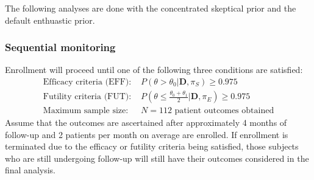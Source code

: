 \documentclass[12pt]{article}
\begin{document}


The following analyses are done with the concentrated skeptical prior and the default enthuastic prior.
\subsubsection{Sequential monitoring}
Enrollment will proceed until one of the following three conditions are satisfied:
\begin{align*}
\text{Efficacy criteria (EFF): }&P(\theta>\theta_0|\mathbf{D},\pi_S)\geq 0.975\\
\text{Futility criteria (FUT): }&P\left(\theta\leq\frac{\theta_0+\theta_1}{2} \Big|\mathbf{D},\pi_E\right)\geq 0.975\\
\text{Maximum sample size: }&N=112 \text{ patient outcomes obtained}
\end{align*}
Assume that the outcomes are ascertained after approximately 4 months of follow-up and 2 patients per month on average are enrolled. If enrollment is terminated due to the efficacy or futility criteria being satisfied, those subjects who are still undergoing follow-up will still have their outcomes considered in the final analysis.
\end{document}
